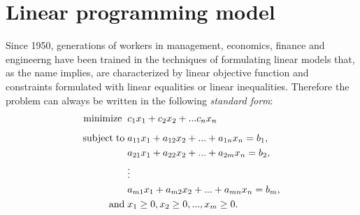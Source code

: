 \documentclass[a4paper,10 pt,titlepage,twoside]{book}
\theoremstyle{plain}
\theoremstyle{definition}
\theoremstyle{remark}
\begin{document}
\section{Linear programming model}

Since 1950, generations of workers in management, economics, finance and engineerng have been trained in the techniques of formulating linear models that,
as the name implies, are characterized by linear objective function and constraints formulated with linear equalities or linear inequalities. Therefore the problem can always be written
in the following \textit{standard form}:
\begin{alignat*}{1}\label{eq:stdform}
\text{minimize\;}\; &c_1 x_1 + c_2 x_2+ ... c_n x_n\\[1.8mm]
\text{subject\;to\;} &a_{11} x_1 + a_{12} x_2+ ... +a_{1n}x_n = b_1,\\
&a_{21} x_1 + a_{22} x_2 + ... + a_{2m} x_n= b_2,\\
&\vdots\\
&a_{m1} x_1 + a_{m2} x_2 + ... + a_{mn} x_n= b_m,\\
\text{and}\; & x_1 \geq 0 , x_2 \geq 0, ... , x_m \geq 0.
 \end{alignat*}
\end{document}
